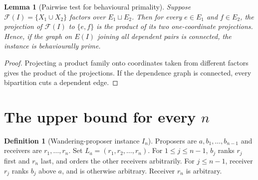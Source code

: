 \documentclass[11pt]{article}
\newtheorem{lemma}[theorem]{Lemma}
\theoremstyle{definition}
\newtheorem{definition}[theorem]{Definition}
\begin{document}
\begin{lemma}[Pairwise test for behavioural primality]\label{lem:pair}
Suppose $\mathcal F(I)=\{X_1\cup X_2\}$ factors over $E_1\sqcup E_2$. Then for every $e\in E_1$ and
$f\in E_2$, the projection of $\mathcal F(I)$ to $\{e,f\}$ is the product of its two
one-coordinate projections. Hence, if the graph on $E(I)$ joining all \emph{dependent} pairs is
connected, the instance is behaviourally prime.
\end{lemma}
\begin{proof}
Projecting a product family onto coordinates taken from different factors gives the product of the
projections. If the dependence graph is connected, every bipartition cuts a dependent edge.
\end{proof}

\section*{The upper bound for every $n$}
\begin{definition}[Wandering-proposer instance $I_n$]
Proposers are $a,b_1,\dots,b_{n-1}$ and receivers are $r_1,\dots,r_n$.
Set $L_a=(r_1,r_2,\dots,r_n)$.
For $1\le j\le n-1$, $b_j$ ranks $r_j$ first and $r_n$ last, and orders the other receivers arbitrarily.
For $j\le n-1$, receiver $r_j$ ranks $b_j$ above $a$, and is otherwise arbitrary. Receiver $r_n$ is arbitrary.
\end{definition}
\end{document}
